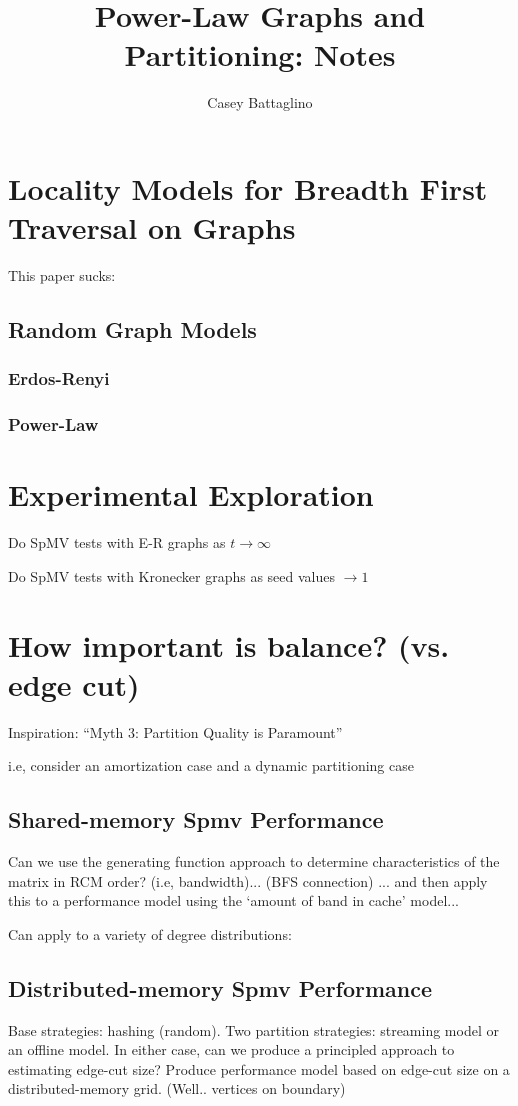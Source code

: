 \documentclass[11pt]{article}
\title{Power-Law Graphs and Partitioning: Notes}
\author{Casey Battaglino}
\date{}
\begin{document}
\maketitle
\tableofcontents

\section{Locality Models for Breadth First Traversal on Graphs}
This paper sucks: \cite{Yuan:2012:MLG:2410141.2410574}

\subsection{Random Graph Models}
\subsubsection{Erdos-Renyi}
\subsubsection{Power-Law}

\section{Experimental Exploration}
Do SpMV tests with E-R graphs as $t \to \infty$

Do SpMV tests with Kronecker graphs as seed values $\to 1$

\section{How important is balance? (vs. edge cut)}
Inspiration: ``Myth 3: Partition Quality is Paramount''

i.e, consider an amortization case and a dynamic partitioning case

\subsection{Shared-memory Spmv Performance}
Can we use the generating function approach to determine characteristics of the matrix in RCM order? (i.e, bandwidth)... (BFS connection) ... and then apply this to a performance model using the `amount of band in cache' model...

Can apply to a variety of degree distributions:


\subsection{Distributed-memory Spmv Performance}
Base strategies: hashing (random).
Two partition strategies: streaming model or an offline model. In either case, can we produce a principled approach to estimating edge-cut size? Produce performance model based on edge-cut size on a distributed-memory grid. (Well.. vertices on boundary)
\end{document}
